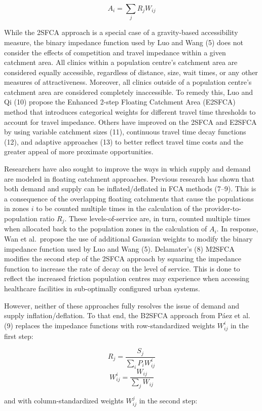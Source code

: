 \documentclass{article}
\begin{document}
\[
A_i = \sum_j{R_jW_{ij}}
\]

While the 2SFCA approach is a special case of a gravity-based
accessibility measure, the binary impedance function used by Luo and
Wang (5) does not consider the effects of competition and travel
impedance within a given catchment area. All clinics within a population
centre's catchment area are considered equally accessible, regardless of
distance, size, wait times, or any other measures of attractiveness.
Moreover, all clinics outside of a population centre's catchment area
are considered completely inaccessible. To remedy this, Luo and Qi (10)
propose the Enhanced 2-step Floating Catchment Area (E2SFCA) method that
introduces categorical weights for different travel time thresholds to
account for travel impedance. Others have improved on the 2SFCA and
E2SFCA by using variable catchment sizes (11), continuous travel time
decay functions (12), and adaptive approaches (13) to better reflect
travel time costs and the greater appeal of more proximate
opportunities.

Researchers have also sought to improve the ways in which supply and
demand are modeled in floating catchment approaches. Previous research
has shown that both demand and supply can be inflated/deflated in FCA
methods (7--9). This is a consequence of the overlapping floating
catchments that cause the populations in zones \(i\) to be counted
multiple times in the calculation of the provider-to-population ratio
\(R_j\). These levels-of-service are, in turn, counted multiple times
when allocated back to the population zones in the calculation of
\(A_i\). In response, Wan et al.~propose the use of additional Gaussian
weights to modify the binary impedance function used by Luo and Wang
(5). Delamater's (8) M2SFCA modifies the second step of the 2SFCA
approach by squaring the impedance function to increase the rate of
decay on the level of service. This is done to reflect the increased
friction population centres may experience when accessing healthcare
facilities in sub-optimally configured urban systems.

However, neither of these approaches fully resolves the issue of demand
and supply inflation/deflation. To that end, the B2SFCA approach from
Páez et al. (9) replaces the impedance functions with row-standardized
weights \(W_{ij}^{i}\) in the first step:

\[
R_j = \frac{S_j}{\sum_i{P_iW_{ij}^{i}}}
\] \[
W_{ij}^{i} = \frac{W_{ij}}{\sum_j W_{ij}}
\]

and with column-standardized weights \(W_{ij}^{j}\) in the second step:
\end{document}
